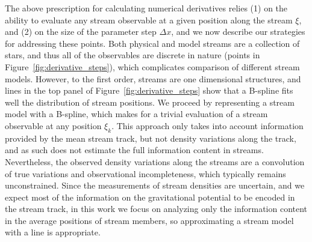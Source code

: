 \documentclass[modern]{aastex61}
\begin{document}
The above prescription for calculating numerical derivatives relies (1) on the ability to evaluate any stream observable at a given position along the stream $\xi$, and (2) on the size of the parameter step $\Delta x$, and we now describe our strategies for addressing these points.
Both physical and model streams are a collection of stars, and thus all of the observables are discrete in nature (points in Figure~\ref{fig:derivative_steps}), which complicates comparison of different stream models.
However, to the first order, streams are one dimensional structures, and lines in the top panel of Figure~\ref{fig:derivative_steps} show that a B-spline fits well the distribution of stream positions.
We proceed by representing a stream model with a B-spline, which makes for a trivial evaluation of a stream observable at any position $\xi_k$.
This approach only takes into account information provided by the mean stream track, but not density variations along the track, and as such does not estimate the full information content in streams.
Nevertheless, the observed density variations along the streams are a convolution of true variations and observational incompleteness, which typically remains unconstrained.
Since the measurements of stream densities are uncertain, and we expect most of the information on the gravitational potential to be encoded in the stream track, in this work we focus on analyzing only the information content in the average positions of stream members, so approximating a stream model with a line is appropriate.
\end{document}
